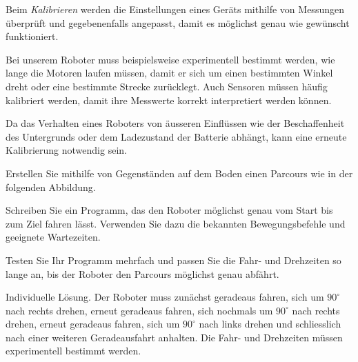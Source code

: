 \begin{myremark}

    Beim \emph{Kalibrieren} werden die Einstellungen eines
    Geräts mithilfe von Messungen überprüft und gegebenenfalls
    angepasst, damit es möglichst genau wie gewünscht
    funktioniert.

    Bei unserem Roboter muss beispielsweise experimentell
    bestimmt werden, wie lange die Motoren laufen müssen,
    damit er sich um einen bestimmten Winkel dreht oder
    eine bestimmte Strecke zurücklegt. Auch Sensoren müssen
    häufig kalibriert werden, damit ihre Messwerte korrekt
    interpretiert werden können.

    Da das Verhalten eines Roboters von äusseren Einflüssen
    wie der Beschaffenheit des Untergrunds oder dem
    Ladezustand der Batterie abhängt, kann eine erneute
    Kalibrierung notwendig sein.
\end{myremark}


\begin{myexercise}

    Erstellen Sie mithilfe von Gegenständen auf dem Boden
    einen Parcours wie in der folgenden Abbildung.

    \begin{center}
    \end{center}

    Schreiben Sie ein Programm, das den Roboter möglichst
    genau vom Start bis zum Ziel fahren lässt.
    Verwenden Sie dazu die bekannten Bewegungsbefehle
    und geeignete Wartezeiten.

    Testen Sie Ihr Programm mehrfach und passen Sie
    die Fahr- und Drehzeiten so lange an, bis der
    Roboter den Parcours möglichst genau abfährt.

    \begin{myanswer}
        Individuelle Lösung. Der Roboter muss zunächst
        geradeaus fahren, sich um \(90^\circ\) nach rechts
        drehen, erneut geradeaus fahren, sich nochmals
        um \(90^\circ\) nach rechts drehen, erneut geradeaus
        fahren, sich um \(90^\circ\) nach links drehen und
        schliesslich nach einer weiteren Geradeausfahrt anhalten.
        Die Fahr- und Drehzeiten müssen experimentell
        bestimmt werden.
    \end{myanswer}
\end{myexercise}


